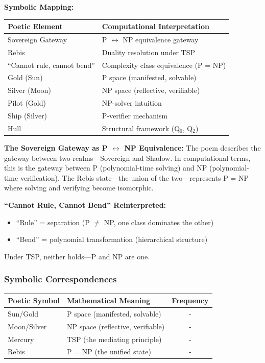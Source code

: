 \documentclass[11pt, letterpaper]{article}
\begin{document}
\textbf{Symbolic Mapping:}

\begin{table}[h]
\centering
\begin{tabular}{ll}
\toprule
Poetic Element & Computational Interpretation \\
\midrule
Sovereign Gateway & P $\leftrightarrow$ NP equivalence gateway \\
Rebis & Duality resolution under TSP \\
``Cannot rule, cannot bend'' & Complexity class equivalence (P = NP) \\
Gold (Sun) & P space (manifested, solvable) \\
Silver (Moon) & NP space (reflective, verifiable) \\
Pilot (Gold) & NP-solver intuition \\
Ship (Silver) & P-verifier mechanism \\
Hull & Structural framework (Q$_0$, Q$_2$) \\
\bottomrule
\end{tabular}
\end{table}

\textbf{The Sovereign Gateway as P $\leftrightarrow$ NP Equivalence:}
The poem describes the gateway between two realms—Sovereign and Shadow. In computational terms, this is the gateway between P (polynomial-time solving) and NP (polynomial-time verification). The Rebis state—the union of the two—represents P = NP where solving and verifying become isomorphic.

\textbf{``Cannot Rule, Cannot Bend'' Reinterpreted:}
\begin{itemize}
    \item ``Rule'' = separation (P $\neq$ NP, one class dominates the other)
    \item ``Bend'' = polynomial transformation (hierarchical structure)
\end{itemize}

Under TSP, neither holds—P and NP are one.

\subsubsection{Symbolic Correspondences}

\begin{table}[h]
\centering
\begin{tabular}{llc}
\toprule
Poetic Symbol & Mathematical Meaning & Frequency \\
\midrule
Sun/Gold & P space (manifested, solvable) & - \\
Moon/Silver & NP space (reflective, verifiable) & - \\
Mercury & TSP (the mediating principle) & - \\
Rebis & P = NP (the unified state) & - \\
\bottomrule
\end{tabular}
\end{table}
\end{document}
